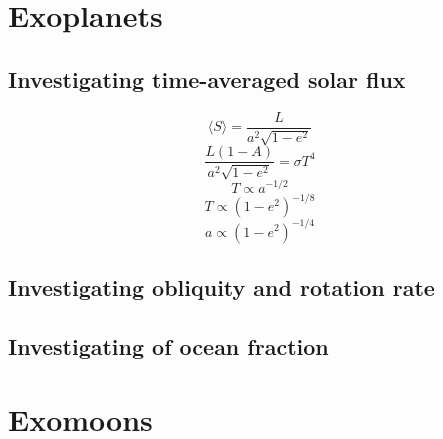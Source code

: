 \documentclass[12pt, onecolumn]{revtex4-2}    %
\begin{document}
\section{Exoplanets} \label{sec:Exoplanets}
\subsection{Investigating time-averaged solar flux} \label{ssec:InvTimeAveragedSolarFlux}
\begin{equation}
    \langle S \rangle = \frac{L}{a^2 \sqrt{1-e^2}} \label{eq:avgInsolation}
\end{equation}
\begin{equation}
    \frac{L (1-A)}{a^2 \sqrt{1-e^2}} = \sigma T^4
\end{equation}
\begin{equation}
    T \propto a^{-1/2}
\end{equation}
\begin{equation}
    T \propto (1-e^2)^{-1/8}
\end{equation}
\begin{equation}
    a \propto (1-e^2)^{-1/4}
\end{equation}
\subsection{Investigating obliquity and rotation rate}\label{ssec:InvObliquityRotationRate}
\subsection{Investigating of ocean fraction} \label{ssec:InvOceanFraction}%

\section{Exomoons} \label{sec:Exomoons}
\end{document}
